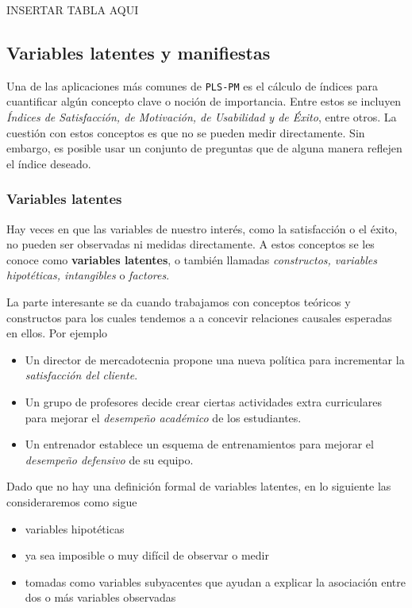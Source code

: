 INSERTAR TABLA AQUI

\subsection{Variables latentes y manifiestas}

Una de las aplicaciones m\'as comunes de \texttt{PLS-PM} es el c\'alculo de \'indices para cuantificar alg\'un concepto clave o noci\'on de importancia. Entre estos se incluyen {\em \'Indices de Satisfacci\'on, de Motivaci\'on, de Usabilidad y de \'Exito}, entre otros. La cuesti\'on con estos conceptos es que no se pueden medir directamente. Sin embargo, es posible usar un conjunto de preguntas que de alguna manera reflejen el \'indice deseado.

\subsubsection{Variables latentes}

Hay veces en que las variables de nuestro inter\'es, como la satisfacci\'on o el \'exito, no pueden ser observadas ni medidas directamente. A estos conceptos se les conoce como {\bf variables latentes}, o tambi\'en llamadas {\em constructos, variables hipot\'eticas, intangibles} o {\em factores}.

La parte interesante se da cuando trabajamos con conceptos te\'oricos y constructos para los cuales tendemos a a concevir relaciones causales esperadas en ellos. Por ejemplo
\begin{itemize}
  \item Un director de mercadotecnia propone una nueva pol\'itica para incrementar la {\em satisfacci\'on del cliente}.
  \item Un grupo de profesores decide crear ciertas actividades extra curriculares para mejorar el {\em desempe\~no acad\'emico} de los estudiantes.
  \item Un entrenador establece un esquema de entrenamientos para mejorar el {\em desempe\~no defensivo} de su equipo.
\end{itemize}

Dado que no hay una definici\'on formal de variables latentes, en lo siguiente las consideraremos como sigue
\begin{itemize}
  \item variables hipot\'eticas
  \item ya sea imposible o muy dif\'icil de observar o medir
  \item tomadas como variables subyacentes que ayudan a explicar la asociaci\'on entre dos o m\'as variables observadas
\end{itemize}

